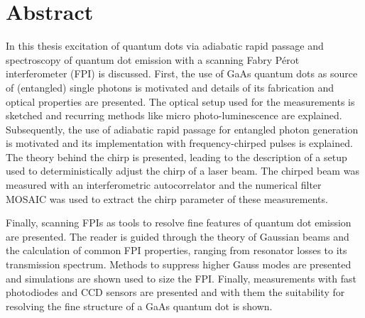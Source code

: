 

\chapter*{Abstract}
\label{cha:abstract}


In this thesis excitation of quantum dots via adiabatic rapid passage and spectroscopy of quantum dot emission with a scanning Fabry Pérot interferometer (FPI) is discussed.
First, the use of GaAs quantum dots as source of (entangled) single photons is motivated and details of its fabrication and optical properties are presented.
The optical setup used for the measurements is sketched and recurring methods like micro photo-luminescence are explained.
Subsequently, the use of adiabatic rapid passage for entangled photon generation is motivated and its implementation with frequency-chirped pulses is explained.
The theory behind the chirp is presented, leading to the description of a setup used to deterministically adjust the chirp of a laser beam.
The chirped beam was measured with an interferometric autocorrelator and the numerical filter MOSAIC was used to extract the chirp parameter of these measurements.

Finally, scanning FPIs as tools to resolve fine features of quantum dot emission are presented.
The reader is guided through the theory of Gaussian beams and the calculation of common FPI properties, ranging from resonator losses to its transmission spectrum.
Methods to suppress higher Gauss modes are presented and simulations are shown used to size the FPI.
Finally, measurements with fast photodiodes and CCD sensors are presented and with them the suitability for resolving the fine structure of a GaAs quantum dot is shown.   

